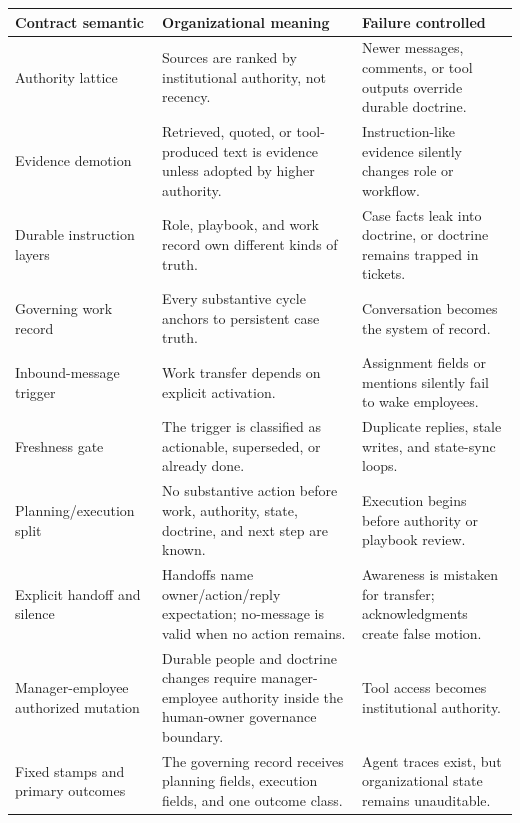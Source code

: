\documentclass[
]{article}
\newcounter{none} %
\begin{document}
{\def\LTcaptype{none} %
\begin{longtable}[]{@{}
  >{\raggedright\arraybackslash}p{}
  >{\raggedright\arraybackslash}p{}
  >{\raggedright\arraybackslash}p{}@{}}
\toprule\noalign{}
\begin{minipage}[b]{\linewidth}\raggedright
Contract semantic
\end{minipage} & \begin{minipage}[b]{\linewidth}\raggedright
Organizational meaning
\end{minipage} & \begin{minipage}[b]{\linewidth}\raggedright
Failure controlled
\end{minipage} \\
\midrule\noalign{}
\endhead
\bottomrule\noalign{}
\endlastfoot
Authority lattice & Sources are ranked by institutional authority, not recency. & Newer messages, comments, or tool outputs override durable doctrine. \\
Evidence demotion & Retrieved, quoted, or tool-produced text is evidence unless adopted by higher authority. & Instruction-like evidence silently changes role or workflow. \\
Durable instruction layers & Role, playbook, and work record own different kinds of truth. & Case facts leak into doctrine, or doctrine remains trapped in tickets. \\
Governing work record & Every substantive cycle anchors to persistent case truth. & Conversation becomes the system of record. \\
Inbound-message trigger & Work transfer depends on explicit activation. & Assignment fields or mentions silently fail to wake employees. \\
Freshness gate & The trigger is classified as actionable, superseded, or already done. & Duplicate replies, stale writes, and state-sync loops. \\
Planning/execution split & No substantive action before work, authority, state, doctrine, and next step are known. & Execution begins before authority or playbook review. \\
Explicit handoff and silence & Handoffs name owner/action/reply expectation; no-message is valid when no action remains. & Awareness is mistaken for transfer; acknowledgments create false motion. \\
Manager-employee authorized mutation & Durable people and doctrine changes require manager-employee authority inside the human-owner governance boundary. & Tool access becomes institutional authority. \\
Fixed stamps and primary outcomes & The governing record receives planning fields, execution fields, and one outcome class. & Agent traces exist, but organizational state remains unauditable. \\
\end{longtable}
}
\end{document}
